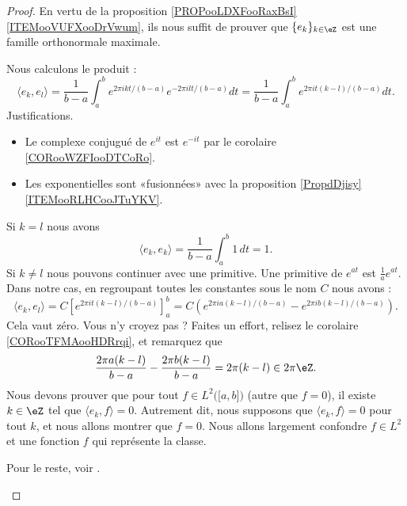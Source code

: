 \begin{proof}
	En vertu de la proposition \ref{PROPooLDXFooRaxBsI}\ref{ITEMooVUFXooDrVwum}, ils nous suffit de prouver que \( \{ e_k \}_{k\in \eZ}\) est une famille orthonormale maximale.

	\begin{subproof}
		\spitem[Orthonormale]
		Nous calculons le produit :
		\begin{equation}
			\langle e_k, e_l\rangle =\frac{1}{ b-a }\int_a^b e^{2\pi i kt/(b-a)} e^{-2\pi i lt/(b-a)}dt
			=\frac{1}{ b-a }\int_a^b e^{2\pi i t(k-l)/(b-a)}dt.
		\end{equation}
		Justifications.
		\begin{itemize}
			\item
			      Le complexe conjugué de \(  e^{it}\) est \(  e^{-it}\) par le corolaire \ref{CORooWZFIooDTCoRo}.
			\item
			      Les exponentielles sont «fusionnées» avec la proposition \ref{PropdDjisy}\ref{ITEMooRLHCooJTuYKV}.
		\end{itemize}
		Si \( k=l\) nous avons
		\begin{equation}
			\langle e_k, e_k\rangle =\frac{1}{ b-a }\int_a^b1\,dt=1.
		\end{equation}
		Si \( k\neq l\) nous pouvons continuer avec une primitive. Une primitive de \(  e^{at}\) est \( \frac{1}{ a } e^{at}\). Dans notre cas, en regroupant toutes les constantes sous le nom \( C\) nous avons :
		\begin{equation}
			\langle e_k, e_l\rangle =C\left[   e^{2\pi it(k-l)/(b-a)} \right]_a^b=C\left(  e^{2\pi i a(k-l)/(b-a)}- e^{2\pi i b(k-l)/(b-a)} \right).
		\end{equation}
		Cela vaut zéro. Vous n'y croyez pas ? Faites un effort, relisez le corolaire \ref{CORooTFMAooHDRrqi}, et remarquez que
		\begin{equation}
			\frac{ 2\pi a(k-l) }{ b-a }-\frac{ 2\pi b(k-l) }{ b-a }=2\pi (k-l)\in 2\pi \eZ.
		\end{equation}
		\spitem[Maximale]
		Nous devons prouver que pour tout \( f\in L^2\big( \mathopen[ a , b \mathclose] \big)\) (autre que \( f=0\)), il existe \( k\in \eZ\) tel que \( \langle e_k, f\rangle =0\). Autrement dit, nous supposons que \( \langle e_k, f\rangle =0\) pour tout \( k\), et nous allons montrer que \( f=0\). Nous allons largement confondre \( f\in L^2\) et une fonction \( f\) qui représente la classe.

		Pour le reste, voir \cite{BIBooZYKMooGGbwyI}.
	\end{subproof}
\end{proof}

